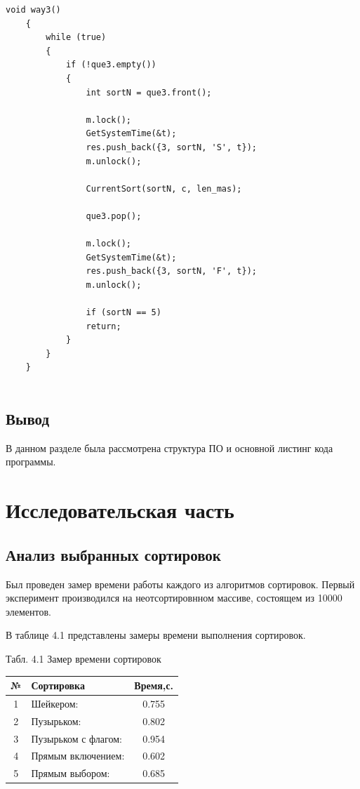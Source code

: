 \documentclass[12pt]{report}
\begin{document}
\par
\begin{lstlisting}[label=some-code,caption=Лента №3]
	void way3()
	{
		while (true)
		{
			if (!que3.empty())
			{
				int sortN = que3.front();
				
				m.lock();
				GetSystemTime(&t);
				res.push_back({3, sortN, 'S', t});
				m.unlock();
				
				CurrentSort(sortN, c, len_mas);
				
				que3.pop();
				
				m.lock();
				GetSystemTime(&t);
				res.push_back({3, sortN, 'F', t});
				m.unlock();
				
				if (sortN == 5)
				return;
			}
		}
	}
	
\end{lstlisting}

\section{Вывод}
В данном разделе была рассмотрена структура ПО и основной листинг кода программы.


\chapter{Исследовательская часть}

\section{Анализ выбранных сортировок}
Был проведен замер времени работы каждого из алгоритмов сортировок. Первый эксперимент производился на неотсортировнном массиве, состоящем из 10000 элементов.

\begin{center}
	В таблице {4.1} представлены замеры времени выполнения сортировок.
\end{center}

\begin{center}
	Табл. 4.1 Замер времени сортировок
	
	\begin{tabular}{|c l c|}			
		\hline
		№ & Сортировка & Время,с. \\ [0.5ex] 
		\hline
		1 & Шейкером: & 0.755 \\
		\hline
		2 & Пузырьком: & 0.802 \\
		\hline
		3 & Пузырьком с флагом: & 0.954 \\
		\hline
		4 & Прямым включением: & 0.602\\
		\hline
		5 & Прямым выбором: & 0.685\\
		\hline
		
	\end{tabular}
\end{center}
\end{document}

